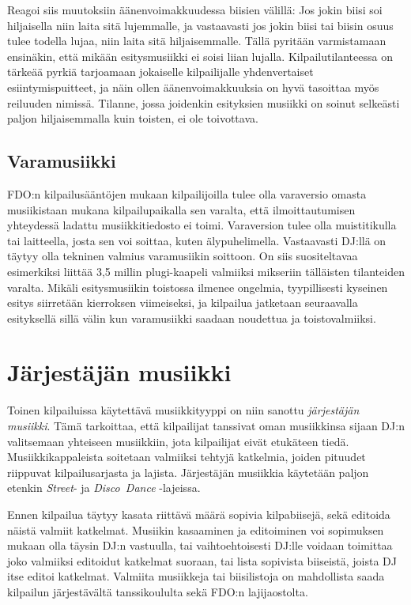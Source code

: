 \documentclass[12pt, a4paper, oneside]{article}
\begin{document}
Reagoi siis muutoksiin äänenvoimakkuudessa biisien välillä: Jos jokin biisi soi hiljaisella niin laita sitä lujemmalle, ja vastaavasti jos jokin biisi tai biisin osuus tulee todella lujaa, niin laita sitä hiljaisemmalle. Tällä pyritään varmistamaan ensinäkin, että mikään esitysmusiikki ei soisi liian lujalla. Kilpailutilanteessa on tärkeää pyrkiä tarjoamaan jokaiselle kilpailijalle yhdenvertaiset esiintymispuitteet, ja näin ollen äänenvoimakkuuksia on hyvä tasoittaa myös reiluuden nimissä. Tilanne, jossa joidenkin esityksien musiikki on soinut selkeästi paljon hiljaisemmalla kuin toisten, ei ole toivottava.

\subsection{Varamusiikki}

FDO:n kilpailusääntöjen mukaan kilpailijoilla tulee olla varaversio omasta musiikistaan mukana kilpailupaikalla sen varalta, että ilmoittautumisen yhteydessä ladattu musiikkitiedosto ei toimi. Varaversion tulee olla muistitikulla tai laitteella, josta sen voi soittaa, kuten älypuhelimella. Vastaavasti DJ:llä on täytyy olla tekninen valmius varamusiikin soittoon. On siis suositeltavaa esimerkiksi liittää 3,5 millin plugi-kaapeli valmiiksi mikseriin tälläisten tilanteiden varalta. Mikäli esitysmusiikin toistossa ilmenee ongelmia, tyypillisesti kyseinen esitys siirretään kierroksen viimeiseksi, ja kilpailua jatketaan seuraavalla esityksellä sillä välin kun varamusiikki saadaan noudettua ja toistovalmiiksi.

\section{Järjestäjän musiikki} \label{dj_musa}

Toinen kilpailuissa käytettävä musiikkityyppi on niin sanottu \textit{järjestäjän musiikki}. Tämä tarkoittaa, että kilpailijat tanssivat oman musiikkinsa sijaan DJ:n valitsemaan yhteiseen musiikkiin, jota kilpailijat eivät etukäteen tiedä. Musiikkikappaleista soitetaan valmiiksi tehtyjä katkelmia, joiden pituudet riippuvat kilpailusarjasta ja lajista. Järjestäjän musiikkia käytetään paljon etenkin \textit{Street}- ja \textit{Disco~Dance} -lajeissa.

Ennen kilpailua täytyy kasata riittävä määrä sopivia kilpabiisejä, sekä editoida näistä valmiit katkelmat. Musiikin kasaaminen ja editoiminen voi sopimuksen mukaan olla täysin DJ:n vastuulla, tai vaihtoehtoisesti DJ:lle voidaan toimittaa joko valmiiksi editoidut katkelmat suoraan, tai lista sopivista biiseistä, joista DJ itse editoi katkelmat. Valmiita musiikkeja tai biisilistoja on mahdollista saada kilpailun järjestävältä tanssikoululta sekä FDO:n lajijaostolta.
\end{document}
